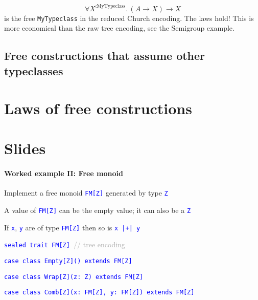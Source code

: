 \[
\forall X^{:\text{MyTypeclass}}.\,(A\rightarrow X)\rightarrow X
\]
is the free \lstinline!MyTypeclass!
in the reduced Church encoding. The laws hold! This is more economical
than the raw tree encoding, see the Semigroup example.

\subsection{Free constructions that assume other typeclasses}

\section{Laws of free constructions}

\section{Slides }

\paragraph{Worked example II: Free monoid}

Implement a free monoid \texttt{\textcolor{blue}{\footnotesize{}FM{[}Z{]}}}
generated by type \texttt{\textcolor{blue}{\footnotesize{}Z}} 

A value of \texttt{\textcolor{blue}{\footnotesize{}FM{[}Z{]}}} can
be the empty value; it can also be a \texttt{\textcolor{blue}{\footnotesize{}Z}} 

If \texttt{\textcolor{blue}{\footnotesize{}x}}, \texttt{\textcolor{blue}{\footnotesize{}y}}
are of type \texttt{\textcolor{blue}{\footnotesize{}FM{[}Z{]}}} then
so is \texttt{\textcolor{blue}{\footnotesize{}x |+| y}} 

\texttt{\textcolor{blue}{\footnotesize{}sealed trait FM{[}Z{]} }}\textcolor{darkgray}{\footnotesize{}//
tree encoding}{\footnotesize\par}

\texttt{\textcolor{blue}{\footnotesize{}case class Empty{[}Z{]}()
extends FM{[}Z{]}}}{\footnotesize\par}

\texttt{\textcolor{blue}{\footnotesize{}case class Wrap{[}Z{]}(z: Z)
extends FM{[}Z{]}}}{\footnotesize\par}

\texttt{\textcolor{blue}{\footnotesize{}case class Comb{[}Z{]}(x: FM{[}Z{]},
y: FM{[}Z{]}) extends FM{[}Z{]}}}{\footnotesize\par}

